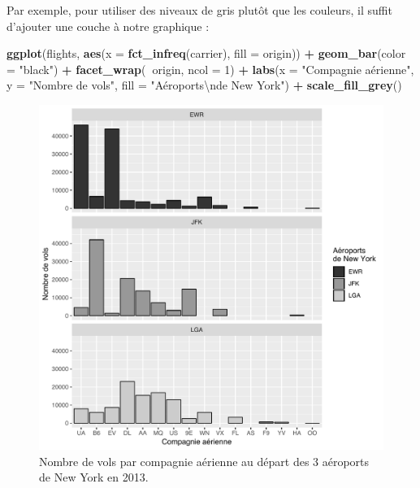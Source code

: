 \documentclass[a4paperpaper,]{article}
\newenvironment{Shaded}{\begin{snugshade}}{\end{snugshade}}
\newcommand{\KeywordTok}[1]{\textcolor[rgb]{0.13,0.29,0.53}{\textbf{#1}}}
\newcommand{\DataTypeTok}[1]{\textcolor[rgb]{0.13,0.29,0.53}{#1}}
\newcommand{\DecValTok}[1]{\textcolor[rgb]{0.00,0.00,0.81}{#1}}
\newcommand{\CharTok}[1]{\textcolor[rgb]{0.31,0.60,0.02}{#1}}
\newcommand{\StringTok}[1]{\textcolor[rgb]{0.31,0.60,0.02}{#1}}
\newcommand{\OperatorTok}[1]{\textcolor[rgb]{0.81,0.36,0.00}{\textbf{#1}}}
\newcommand{\NormalTok}[1]{#1}
\theoremstyle{definition}
\theoremstyle{definition}
\theoremstyle{definition}
\theoremstyle{remark}
\begin{document}
Par exemple, pour utiliser des niveaux de gris plutôt que les couleurs,
il suffit d'ajouter une couche à notre graphique :

\begin{Shaded}
\begin{Highlighting}[]
\KeywordTok{ggplot}\NormalTok{(flights, }\KeywordTok{aes}\NormalTok{(}\DataTypeTok{x =} \KeywordTok{fct_infreq}\NormalTok{(carrier), }\DataTypeTok{fill =}\NormalTok{ origin)) }\OperatorTok{+}
\StringTok{  }\KeywordTok{geom_bar}\NormalTok{(}\DataTypeTok{color =} \StringTok{"black"}\NormalTok{) }\OperatorTok{+}
\StringTok{  }\KeywordTok{facet_wrap}\NormalTok{(}\OperatorTok{~}\NormalTok{origin, }\DataTypeTok{ncol =} \DecValTok{1}\NormalTok{) }\OperatorTok{+}
\StringTok{  }\KeywordTok{labs}\NormalTok{(}\DataTypeTok{x =} \StringTok{"Compagnie aérienne"}\NormalTok{,}
       \DataTypeTok{y =} \StringTok{"Nombre de vols"}\NormalTok{,}
       \DataTypeTok{fill =} \StringTok{"Aéroports}\CharTok{\textbackslash{}n}\StringTok{de New York"}\NormalTok{) }\OperatorTok{+}
\StringTok{  }\KeywordTok{scale_fill_grey}\NormalTok{()}
\end{Highlighting}
\end{Shaded}

\begin{figure}[htpb]

{\centering \includegraphics[width=0.9\linewidth]{figure/barfacetgray-1} 

}

\caption{Nombre de vols par compagnie aérienne au départ des 3 aéroports de New York en 2013.}\label{fig:barfacetgray}
\end{figure}
\end{document}
